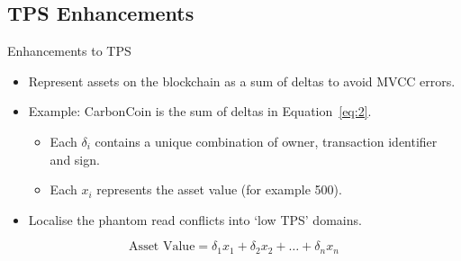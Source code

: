 \subsection{TPS Enhancements}
\begin{frame}{Enhancements to TPS}
    \begin{itemize}
        \item Represent assets on the blockchain as a sum of deltas to avoid
              MVCC errors.
        \item Example: CarbonCoin is the sum of deltas in Equation~\ref{eq:2}.
              \begin{itemize}
                  \item Each $\delta_i$ contains a unique combination of owner,
                        transaction identifier and sign.
                  \item Each $x_i$ represents the asset value (for example 500).
              \end{itemize}
        \item Localise the phantom read conflicts into `low TPS' domains.
    \end{itemize}
    \begin{equation}
        \text{Asset Value} = \delta_1 x_1 + \delta_2 x_2 + \dots + \delta_n x_n
        \label{eq:2}
    \end{equation}
\end{frame}